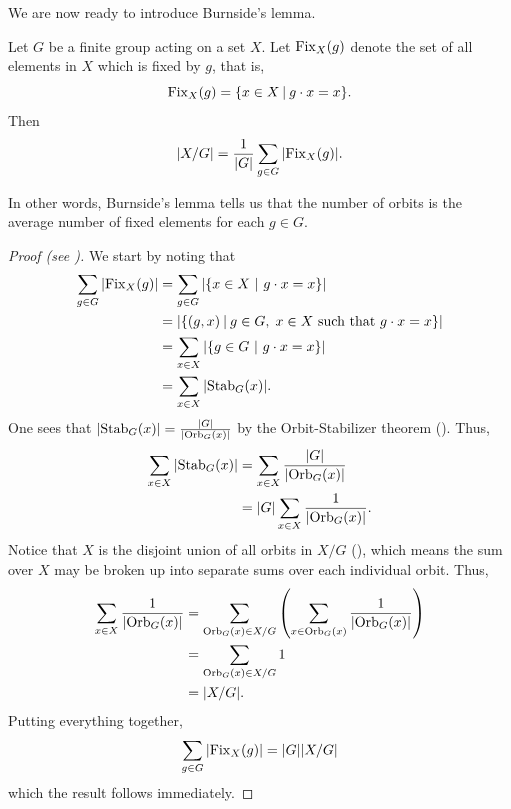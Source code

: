 We are now ready to introduce Burnside's lemma.
\begin{lemma}[Burnside]\label{lemma-burnside}
    Let $G$ be a finite group acting on a set $X$. Let $\mathrm{Fix}_{X}(g)$ denote the set of all elements in $X$ which is fixed by $g$, that is,
    \[
        \Fix{X}{g} = \{x \in X \vert g\cdot x = x\}.
    \]
    Then
    \[
        |X/G| = \frac{1}{|G|}\sum_{g\in G} |\mathrm{Fix}_{X}(g)|.
    \]
\end{lemma}
In other words, Burnside's lemma tells us that the number of orbits is the average number of fixed elements for each $g \in G$.
\begin{proof}[Proof (see \cite{proofwiki_burnsideslemma})]
    We start by noting that
    \begin{align*}
        \sum_{g\in G} |\Fix{X}{g}| &= \sum_{g\in G} |\{x \in X \vertalt g\cdot x = x\}|\\
        &= |\{(g, x) \vert g \in G,\; x \in X \text{ such that } g\cdot x = x\}|\\
        &= \sum_{x\in X} |\{g \in G \vertalt g\cdot x = x\}|\\
        &= \sum_{x\in X} |\Stab{G}{x}|.
    \end{align*}
    One sees that $|\mathrm{Stab}_{G}(x)| = \frac{|G|}{|\mathrm{Orb}_{G}(x)|}$ by the Orbit-Stabilizer theorem (). Thus,
    \begin{align*}
        \sum_{x\in X} |\mathrm{Stab}_{G}(x)| &= \sum_{x\in X} \frac{|G|}{|\mathrm{Orb}_{G}(x)|}\\
        &= |G|\sum_{x\in X} \frac{1}{|\mathrm{Orb}_{G}(x)|}.
    \end{align*}
    Notice that $X$ is the disjoint union of all orbits in $X/G$ (), which means the sum over $X$ may be broken up into separate sums over each individual orbit. Thus,
    \begin{align*}
        \sum_{x\in X} \frac{1}{|\mathrm{Orb}_{G}(x)|} &= \sum_{\mathrm{Orb}_{G}(x) \in X/G}\left(\sum_{x \in \mathrm{Orb}_{G}(x)} \frac{1}{|\mathrm{Orb}_{G}(x)|}\right)\\
        &= \sum_{\mathrm{Orb}_{G}(x) \in X/G} 1\\
        &= |X/G|.
    \end{align*}
    Putting everything together,
    \[
        \sum_{g\in G} |\mathrm{Fix}_{X}(g)| = |G||X/G|
    \]
    which the result follows immediately.
\end{proof}


